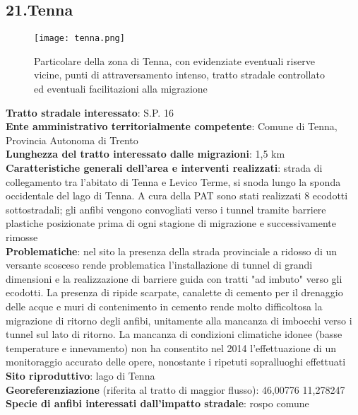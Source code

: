 \documentclass[11pt,a4paper,twoside]{memoir}
\begin{document}
\newpage
\begin{tcolorbox}[breakable,colback=white,colframe=green,width=10cm]
\subsection{21.Tenna}
\end{tcolorbox}

\begin{figure}[H]
\label{fig:map_tenna}
\centering
  \texttt{[image: tenna.png]}
\caption{Particolare della zona di Tenna, con evidenziate eventuali riserve vicine, punti di attraversamento intenso, tratto stradale controllato ed eventuali facilitazioni alla migrazione}
\end{figure}

\textbf{Tratto stradale interessato}: S.P. 16 \\
\textbf{Ente amministrativo territorialmente competente}: Comune di Tenna, Provincia Autonoma di Trento \\
\textbf{Lunghezza del tratto interessato dalle migrazioni}: 1,5 km \\
\textbf{Caratteristiche generali dell’area e interventi realizzati}: strada di collegamento tra l'abitato di Tenna e Levico Terme, si snoda lungo la sponda occidentale del lago di Tenna. A cura della PAT sono stati realizzati 8 ecodotti sottostradali; gli anfibi vengono convogliati verso i tunnel tramite barriere plastiche posizionate prima di ogni stagione di migrazione e successivamente rimosse \\
\textbf{Problematiche}: nel sito la presenza della strada provinciale a ridosso di un versante scosceso rende problematica l'installazione di tunnel di grandi dimensioni e la realizzazione di barriere guida con tratti "ad imbuto" verso gli ecodotti. La presenza di ripide scarpate, canalette di cemento per il drenaggio delle acque e muri di contenimento in cemento rende molto difficoltosa la migrazione di ritorno degli anfibi, unitamente alla mancanza di imbocchi verso i tunnel sul lato di ritorno. La mancanza di condizioni climatiche idonee (basse temperature e innevamento) non ha consentito nel 2014 l'effettuazione di un monitoraggio accurato delle opere, nonostante i ripetuti sopralluoghi effettuati  \\
\textbf{Sito riproduttivo}: lago di Tenna \\
\textbf{Georeferenziazione} (riferita al tratto di maggior flusso): 46,00776 11,278247  \\
\textbf{Specie di anfibi interessati dall’impatto stradale}: rospo comune \\
\end{document}
